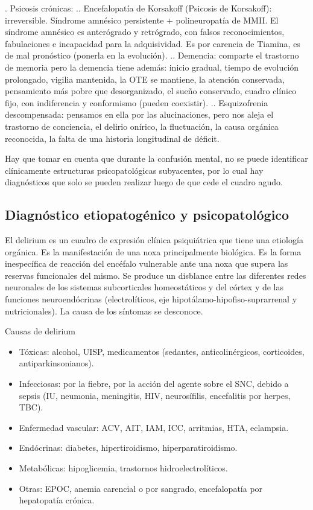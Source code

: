 \documentclass{scrbook}
\begin{document}
. Psicosis crónicas:
.. Encefalopatía de Korsakoff (Psicosis de Korsakoff): irreversible. Síndrome amnésico persistente + polineuropatía de MMII. El síndrome amnésico es anterógrado y retrógrado, con falsos reconocimientos, fabulaciones e incapacidad para la adquisividad. Es por carencia de Tiamina, es de mal pronóstico (ponerla en la evolución).
.. Demencia: comparte el trastorno de memoria pero la demencia tiene además: inicio gradual, tiempo de evolución prolongado, vigilia mantenida, la OTE se mantiene, la atención conservada, pensamiento más pobre que desorganizado, el sueño conservado, cuadro clínico fijo, con indiferencia y conformismo (pueden coexistir).
.. Esquizofrenia descompensada: pensamos en ella por las alucinaciones, pero nos aleja el trastorno de conciencia, el delirio onírico, la fluctuación, la causa orgánica reconocida, la falta de una historia longitudinal de déficit.

Hay que tomar en cuenta que durante la confusión mental, no se puede identificar clínicamente estructuras psicopatológicas subyacentes, por lo cual hay diagnósticos que solo se pueden realizar luego de que cede el cuadro agudo.

\subsection*{Diagnóstico etiopatogénico y psicopatológico}

El delirium es un cuadro de expresión clínica psiquiátrica que tiene una etiología orgánica. Es la manifestación de una noxa principalmente biológica. Es la forma inespecífica de reacción del encéfalo vulnerable ante una noxa que supera las reservas funcionales del mismo. Se produce un disblance entre las diferentes redes neuronales de los sistemas subcorticales homeostáticos y del córtex y de las funciones neuroendócrinas (electrolíticos, eje hipotálamo-hipofiso-suprarrenal y nutricionales). La causa de los síntomas se desconoce.

Causas de delirium
\begin{itemize}
	\item Tóxicas: alcohol, UISP, medicamentos (sedantes, anticolinérgicos, corticoides, antiparkinsonianos).
	\item Infecciosas: por la fiebre, por la acción del agente sobre el SNC, debido a sepsis (IU, neumonia, meningitis, HIV, neurosífilis, encefalitis por herpes, TBC).
	\item Enfermedad vascular: ACV, AIT, IAM, ICC, arritmias, HTA, eclampsia.
	\item Endócrinas: diabetes, hipertiroidismo, hiperparatiroidismo.
	\item Metabólicas: hipoglicemia, trastornos hidroelectrolíticos.
	\item Otras: EPOC, anemia carencial o por sangrado, encefalopatía por hepatopatía crónica.
\end{itemize}
\end{document}

